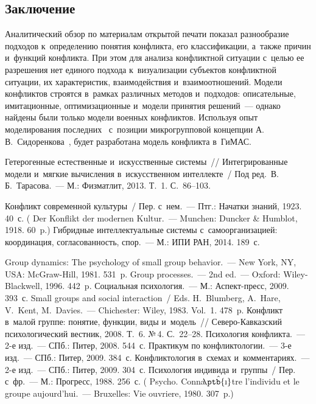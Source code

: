 \begin{multicols}{2}
\section{Заключение}

  Аналитический обзор по материалам открытой печати показал разнообразие 
подходов к~определению понятия конфликта, его классификации, а~так\-же 
причин и~функций конфликта. При этом для анализа конфликтной ситуации 
с~целью ее разрешения нет единого подхода к~визуализации субъектов 
конфликтной ситуации, их характеристик, взаимодействия и~взаимоотношений. 
Модели конфликтов строятся в~рамках различных методов и~подходов: 
описательные, имитационные, оптимизационные и~модели принятия  
решений~--- однако найдены были только модели военных конфликтов. 
Используя опыт моделирования  
последних~\cite{15-r, 16-r, 17-r, 18-r, 19-r, 20-r, 21-r} с~позиции микрогрупповой 
концепции А.\,В.~Сидоренкова~\cite{10-r}, будет разработана модель 
конфликта в~\mbox{ГиМАС.}
  
  {\small\frenchspacing
 {%
 \begin{thebibliography}{99}
 Гетерогенные естественные и~искусственные системы~// 
Интегрированные модели и~мягкие вычисления в~искусственном интеллекте~/
Под ред.\ В.\,Б.~Тарасова.~--- М.: Физматлит, 2013. Т.~1. С.~86--103.

 Конфликт современной культуры~/ Пер. с~нем.~--- Птг.: Начатки знаний, 
1923. 40~с. ( Der Konflikt der modernen Kultur.~--- Munchen: Duncker \& 
Humblot, 1918. 60~p.)
 Гиб\-рид\-ные интеллектуальные 
системы с~самоорганизацией: координация, согласованность, спор.~--- М.: ИПИ РАН, 2014. 
189~с.

 Group dynamics: The psychology of small group behavior.~--- New York, NY, 
USA: McGraw-Hill, 1981. 531~p.
 Group processes.~--- 2nd ed.~--- Oxford: Wiley-Blackwell, 1996. 442~p.
 Социальная психология.~--- М.: Аспект-пресс, 2009. 393~с.
Small groups and social interaction~/ Eds. H.~Blumberg, A.~Hare, V.~Kent, M.~Davies.~--- 
Chichester: Wiley, 1983. Vol.~1. 478~p.
 Конфликт в~малой группе: понятие, функции, виды и~модель~//  
Се\-ве\-ро-Кав\-каз\-ский психологический вестник, 2008. Т.~6. №\,4. С.~22--28.
 Психология конфликта.~--- 2-е изд.~--- СПб.: Питер, 2008. 544~с.
 Практикум по конфликтологии.~--- 3-е изд.~--- СПб.: Питер, 2009. 
384~с.
 Конфликтология в~схемах и~комментариях.~--- 
2-е изд.~--- СПб.: Питер, 2009. 304~с.
 Психология индивида и~группы~/ Пер. с~фр.~--- М.: 
Прогресс, 1988. 256~с. ( Psycho. 
Conna$\hat{\mbox{\!\normalsize\!\ptb{\i}}}$tre l'individu et le groupe aujourd'hui.~--- Bruxelles: Vie ouvriere, 
1980. 307~p.)


\end{thebibliography}}}
\end{multicols}
